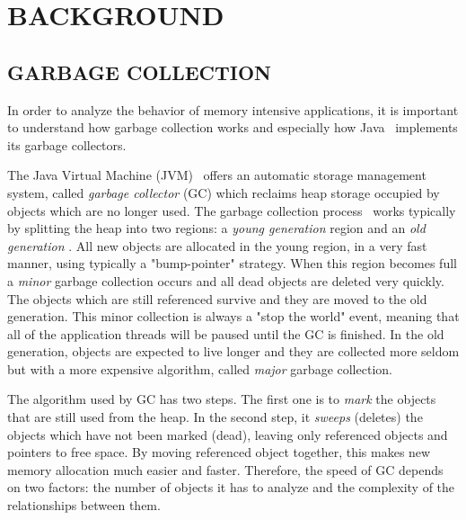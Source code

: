 \documentclass[a4paper,twoside]{article}
\begin{document}
\section{\uppercase{Background}}\label{sec:uppercase5}

\subsection{\uppercase{Garbage Collection}}\label{subsec:uppercase14}

In order to analyze the behavior of memory intensive applications,
it is important to understand how garbage collection works and especially how Java~\cite{java} implements its garbage collectors.

The Java Virtual Machine (JVM)~\cite{lindholm:2014} offers an automatic storage management system, called {\textit{garbage collector}  (GC)} which reclaims heap storage occupied by objects which are no longer used.
The garbage collection process~\cite{gc:oracle} works typically by splitting the heap into two regions: a {\textit{young generation} } region and an {\textit{old generation} }.
All new objects are allocated in the young region, in a very fast manner, using typically a "bump-pointer" strategy.
When this region becomes full  a {\textit{minor} } garbage collection occurs and all dead objects are deleted very quickly.
The objects which are still referenced survive and they  are moved to the old generation.
This minor collection is always a "stop the world" event, meaning that all of the application threads will be paused until the GC is finished.
In the old generation, objects are expected to live longer and they are collected more seldom but with a more expensive algorithm, called {\textit{major} } garbage collection.

The algorithm used by GC has two steps.
The first one is to {\textit{mark} } the objects that are still used from the heap.
In the second step, it {\textit{sweeps}  (deletes)} the objects which have not been marked (dead), leaving only referenced objects and pointers to free space.
By moving referenced object together, this makes new memory allocation much easier and faster.
Therefore, the speed of GC depends on two factors: the number of objects it has to analyze and the complexity of the relationships between them. %
\end{document}
